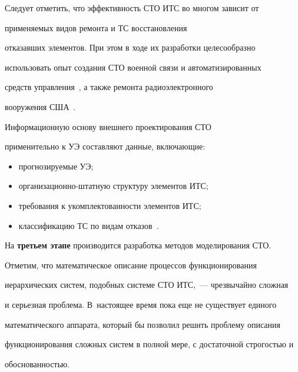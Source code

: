   


  Следует отметить, что эффективность СТО ИТС во многом зависит от 


применяемых видов ремонта и ТС восстановления 


отказавших элементов. При этом в ходе их разработки целесообразно 


использовать опыт создания СТО военной связи и автоматизированных 


средств управления~\cite{13-gr}, а также ремонта радиоэлектронного 


вооружения США~\cite{14-gr}.


  


  Информационную основу внешнего проектирования СТО 


применительно к УЭ составляют данные, включающие: 


  \begin{itemize}


\item прогнозируемые УЭ;


\item организационно-штатную структуру элементов ИТС; 


\item требования к укомплектованности элементов ИТС;


\item классификацию ТС по видам отказов~\cite{15-gr}.


\end{itemize}





  На \textbf{третьем этапе} производится разработка методов моделирования СТО. 


  


  Отметим, что математическое описание процессов функционирования 


иерархических систем, подобных системе СТО ИТС,~--- чрезвычайно сложная 


и серьезная проблема. В~настоящее время пока еще не существует единого 


математического аппарата, который бы позволил решить проблему описания 


функционирования сложных систем в полной мере, с достаточной строгостью и 


обоснованностью. 


  


